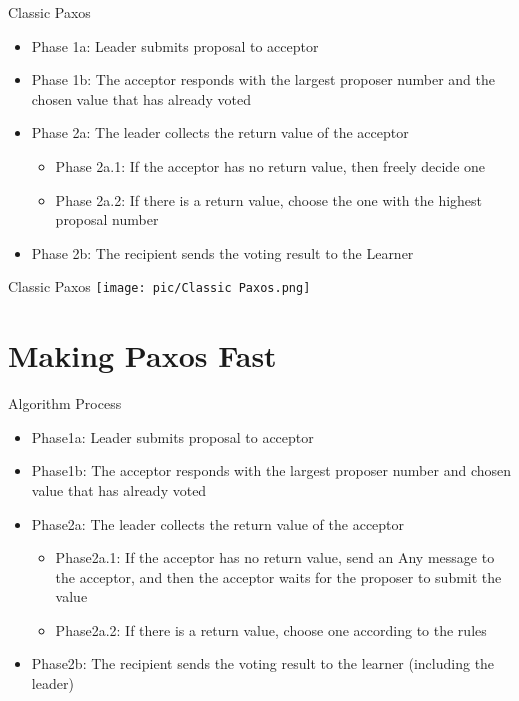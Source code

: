 \documentclass[10pt]{beamer}
\begin{document}
\begin{frame}[fragile]{Classic Paxos}
    \begin{itemize}
        \item Phase 1a: Leader submits proposal to acceptor
        \item Phase 1b: The acceptor responds with the largest proposer number and the chosen value that has already voted
        \item Phase 2a: The leader collects the return value of the acceptor
        \begin{itemize}
            \item Phase 2a.1: If the acceptor has no return value, then freely decide one
            \item Phase 2a.2: If there is a return value, choose the one with the highest proposal number
        \end{itemize}
        \item Phase 2b: The recipient sends the voting result to the Learner
    \end{itemize}
\end{frame}

\begin{frame}[fragile]{Classic Paxos}
    \texttt{[image: pic/Classic Paxos.png]}
\end{frame}

\section{Making Paxos Fast}

\begin{frame}[fragile]{Algorithm Process}
    \begin{itemize}
        \item Phase1a: Leader submits proposal to acceptor
        \item Phase1b: The acceptor responds with the largest proposer number and chosen value that has already voted
        \item Phase2a: The leader collects the return value of the acceptor
        \begin{itemize}
            \item Phase2a.1: If the acceptor has no return value, send an Any message to the acceptor, and then the acceptor waits for the proposer to submit the value
            \item Phase2a.2: If there is a return value, choose one according to the rules
        \end{itemize}
        \item Phase2b: The recipient sends the voting result to the learner (including the leader)
    \end{itemize}
\end{frame}
\end{document}
